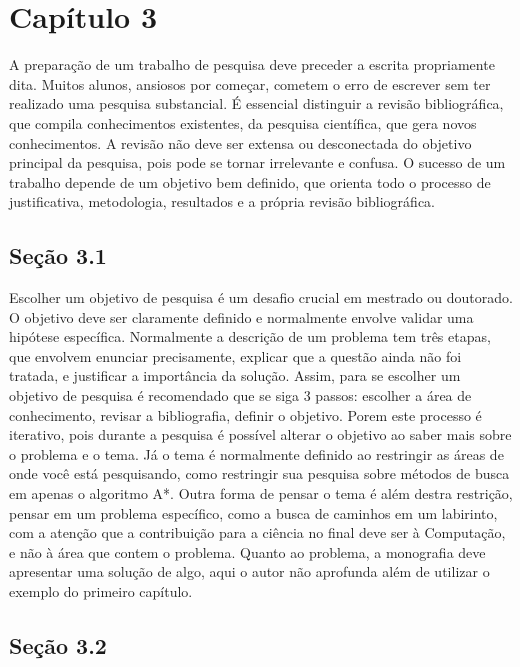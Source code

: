 \documentclass[
	12pt,				%
	openright,			%
	oneside,			%
	a4paper,			%
	chapter=TITLE,		%
	subsection=TITLE,	%
	english,			%
	brazilian,				%
	]{abntex2}
\begin{document}
\section*{Capítulo 3}
A preparação de um trabalho de pesquisa deve preceder a escrita propriamente dita. Muitos alunos, ansiosos por começar, cometem o erro de escrever sem ter realizado uma pesquisa substancial. É essencial distinguir a revisão bibliográfica, que compila conhecimentos existentes, da pesquisa científica, que gera novos conhecimentos. A revisão não deve ser extensa ou desconectada do objetivo principal da pesquisa, pois pode se tornar irrelevante e confusa. O sucesso de um trabalho depende de um objetivo bem definido, que orienta todo o processo de justificativa, metodologia, resultados e a própria revisão bibliográfica.

\subsection*{Seção 3.1}
Escolher um objetivo de pesquisa é um desafio crucial em mestrado ou doutorado. O objetivo deve ser claramente definido e normalmente envolve validar uma hipótese específica.
Normalmente a descrição de um problema tem três etapas, que envolvem enunciar precisamente, explicar que a questão ainda não foi tratada, e justificar a importância da solução.
Assim, para se escolher um objetivo de pesquisa é recomendado que se siga 3 passos: escolher a área de conhecimento, revisar a bibliografia, definir o objetivo. Porem este processo é iterativo, pois durante a pesquisa é possível alterar o objetivo ao saber mais sobre o problema e o tema.
Já o tema é normalmente definido ao restringir as áreas de onde você está pesquisando, como restringir sua pesquisa sobre métodos de busca em apenas o algoritmo A*. Outra forma de pensar o tema é além destra restrição, pensar em um problema específico, como a busca de caminhos em um labirinto, com a atenção que a contribuição para a ciência no final deve ser à Computação, e não à área que contem o problema.
Quanto ao problema, a monografia deve apresentar uma solução de algo, aqui o autor não aprofunda além de utilizar o exemplo do primeiro capítulo.

\subsection*{Seção 3.2}
\end{document}
